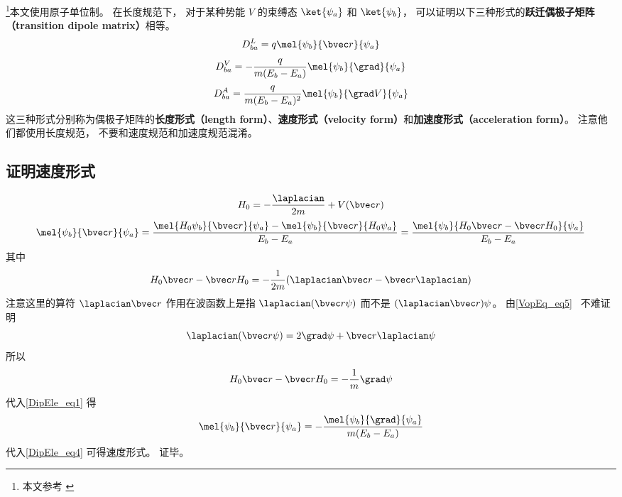 

\footnote{本文参考 \cite{Bransden}}本文使用原子单位制。 在长度规范下， 对于某种势能 $V$ 的束缚态 $\ket{\psi_a}$ 和 $\ket{\psi_b}$， 可以证明以下三种形式的\textbf{跃迁偶极子矩阵（transition dipole matrix）}相等。
\begin{equation}\label{DipEle_eq4}
D_{ba}^L = q\mel{\psi_b}{\bvec r}{\psi_a}
\end{equation}
\begin{equation}\label{DipEle_eq3}
D_{ba}^V = -\frac{q}{m(E_b - E_a)}\mel{\psi_b}{\grad}{\psi_a}
\end{equation}
\begin{equation}
D_{ba}^A = \frac{q}{m(E_b-E_a)^2} \mel{\psi_b}{\grad V}{\psi_a}
\end{equation}
这三种形式分别称为偶极子矩阵的\textbf{长度形式（length form）}、\textbf{速度形式（velocity form）}和\textbf{加速度形式（acceleration form）}。 注意他们都使用长度规范， 不要和速度规范和加速度规范混淆。 %

\subsection{证明速度形式}
\begin{equation}
H_0 = -\frac{\laplacian}{2m} + V(\bvec r)
\end{equation}
\begin{equation}\label{DipEle_eq1}
\mel{\psi_b}{\bvec r}{\psi_a} = \frac{\mel{H_0\psi_b}{\bvec r}{\psi_a} - \mel{\psi_b}{\bvec r}{H_0\psi_a}}{E_b - E_a} = \frac{\mel{\psi_b}{H_0\bvec r - \bvec rH_0}{\psi_a}}{E_b - E_a}
\end{equation}
其中
\begin{equation}
H_0\bvec r - \bvec rH_0 = -\frac{1}{2m}(\laplacian \bvec r - \bvec r \laplacian)
\end{equation}
注意这里的算符 $\laplacian \bvec r$ 作用在波函数上是指 $\laplacian (\bvec r \psi)$ 而不是 $(\laplacian \bvec r) \psi$。 由\autoref{VopEq_eq5}~ 不难证明
\begin{equation}
\laplacian (\bvec r \psi) = 2 \grad \psi + \bvec r \laplacian \psi
\end{equation}
所以
\begin{equation}
H_0\bvec r - \bvec rH_0 = -\frac{1}{m}\grad \psi
\end{equation}
代入\autoref{DipEle_eq1} 得
\begin{equation}
\mel{\psi_b}{\bvec r}{\psi_a} = -\frac{\mel{\psi_b}{\grad}{\psi_a}}{m(E_b - E_a)}
\end{equation}
代入\autoref{DipEle_eq4} 可得速度形式。 证毕。

